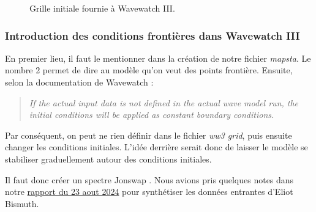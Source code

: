 \documentclass[10pt]{article}
\numberwithin{equation}{section}
\begin{document}
\begin{figure}
\begin{center}
\end{center}
\caption{\label{org8d5f46a}Grille initiale fournie à Wavewatch III.}
\end{figure}
\subsubsection{Introduction des conditions frontières dans Wavewatch III}
\label{sec:orgbf8cb5d}

En premier lieu, il faut le mentionner dans la création de notre fichier \emph{mapsta}. Le nombre 2 permet de dire au modèle qu'on veut des points frontière. Ensuite, selon la documentation de Wavewatch : \medskip
\begin{quote}
\emph{If the actual input data is not defined in the actual wave model run, the initial conditions will be applied as constant boundary conditions.}\medskip
\end{quote}
Par conséquent, on peut ne rien définir dans le fichier \emph{ww3 grid}, puis ensuite changer les conditions initiales. L'idée derrière serait donc de laisser le modèle se stabiliser graduellement autour des conditions initiales.\bigskip

Il faut donc créer un spectre Jonswap \autocite{hasselmann1973measurements}. Nous avions pris quelques notes dans notre \href{rapport-2024-08-23.pdf}{rapport du 23 aout 2024} pour synthétiser les données entrantes d'Eliot Bismuth.
\end{document}

